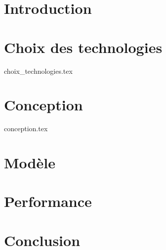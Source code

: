 \documentclass[
    reds, %
    il, %
]{heig-tb}
\let\cleardoublepage=\clearpage
\begin{document}
\maketitle
\frontmatter

\preamble
\authentification

%    
\clearemptydoublepage
{
    \tableofcontents
    \let\cleardoublepage\clearpage
    \listoffigures
    \let\cleardoublepage\clearpage
    \listoftables
    \let\cleardoublepage\clearpage
    \listoflistings
}
\printnomenclature
\clearemptydoublepage
{}

\mainmatter

\chapter{Introduction}



\chapter{Choix des technologies}
 {choix_technologies.tex}

\chapter{Conception}
 {conception.tex}

\chapter{Modèle}


\chapter{Performance}


\chapter{Conclusion}


\clearpage

\appendix
\appendixpage
\addappheadtotoc
\end{document}
